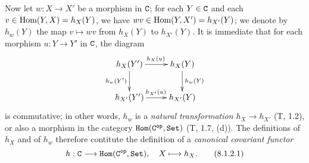 \begin{env}[8.1.2]
\label{env-0.8.1.2}
Now let $w:X\to X'$ be a morphism in $\mathtt{C}$; for each $Y\in\mathtt{C}$ and each $v\in{\mathop{\mathrm{Hom}}\nolimits}(Y,X)=h_X(Y)$,
we have $wv\in{\mathop{\mathrm{Hom}}\nolimits}(Y,X')=h_{X'}(Y)$; we denote by $h_w(Y)$ the map $v\mapsto wv$ from
$h_X(Y)$ to $h_{X'}(Y)$. It is immediate that for each morphism $u:Y\to Y'$ in $\mathtt{C}$, the
diagram
\[
  \xymatrix{
    h_X(Y')\ar[r]^{h_X(u)}\ar[d]_{h_w(Y')} &
    h_X(Y)\ar[d]^{h_w(Y)}\\
    h_{X'}(Y')\ar[r]^{h_{X'}(u)} &
    h_{X'}(Y)
  }
\]
is commutative; in other words, $h_w$ is a {\em natural transformation $h_X\to h_{X'}$}
(T, 1.2), or also a morphism in the category $\mathtt{Hom}(\mathtt{C}^\mathtt{op},\mathtt{Set})$ (T, 1.7, (d)). The
definitions of $h_X$ and of $h_w$ therefore contitute the definition of a {\em canonical
covariant functor}
\[
  h:\mathtt{C}\longrightarrow\mathtt{Hom}(\mathtt{C}^\mathtt{op},\mathtt{Set}),\quad X\longmapsto h_X.
  \tag{8.1.2.1}
\]
\end{env}






